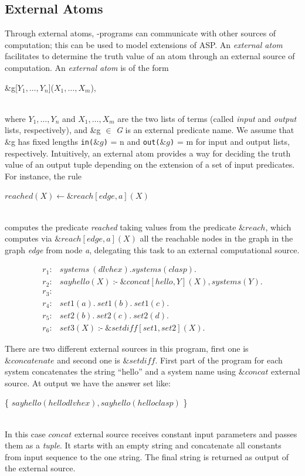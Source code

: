 \documentclass[14pt,a4paper, titlepage]{article}
\newcommand{\ext}[3]{\ensuremath{\&{#1}[#2](#3)}}
\DeclareMathOperator{\leftimpl}{:-}
\begin{document}
\subsection{External Atoms}
\label{extatoms}
Through external atoms, \hex{}-programs can communicate 
with other sources of computation; this can be used to 
model extensions of ASP.  
An \emph{external atom} facilitates to determine the truth 
value of an atom through an external source of computation.
An \emph{external atom} is of the form \\ \centerline{ 
\&g[$Y_1,\dots,Y_n$]($X_1,\dots,X_m$),} \\where $Y_1,
\dots,Y_n$ and $X_1,\dots,X_m$ are the two lists of terms 
(called \textit{input} and \textit{output} lists, 
respectively), and \&g $\in$ \textit{G} is an external 
predicate name. We assume that \&g has fixed lengths 
\texttt{in($\&g$)} = n and \texttt{out($\&g$)} = m for 
input and output lists, respectively. Intuitively, an 
external atom provides a way for deciding the truth value 
of an output tuple depending on the extension of a set of 
input predicates.
For instance, the rule \\ \centerline{ \textit{$reached(X) 
\leftarrow \&reach[edge,a](X)$}}
\\computes the predicate \textit{reached} taking values 
from the predicate $\&reach$, which computes via 
\textit{$\&reach[edge,a](X)$} all the reachable nodes in 
the graph in the graph \textit{edge} from node \textit{a}, 
delegating this task to an external computational source.
\begin{exmp}
\begin{align*}
r_1\colon& \mathit{systems} \ (\mathit{dlvhex}). 
\mathit{systems}(\mathit{clasp}). \\  
r_2\colon& \mathit{sayhello(X)} \leftimpl 
\ext{\mathit{concat}}{\mathit{hello, Y}}{\mathit{X}}, 
\mathit{systems(Y).}  \\ 
r_3\colon & \\
r_4\colon& \mathit{set1}(a). \ \mathit{set1}(b). \ 
\mathit{set1}(c).\\
r_5\colon& \mathit{set2}(b). \ \mathit{set2}(c). \ 
\mathit{set2}(d).\\
r_6\colon& \mathit{set3}(X) \leftimpl 
\ext{\mathit{setdiff}}{\mathit{set1, set2}}{\mathit{X}}. 
\end{align*}
\end{exmp}

There are two different external sources in this program, 
first one is $\mathit{\&concatenate}$ and second one is 
$\mathit{\&setdiff}$. First part of the program for each 
system concatenates the string \enquote{hello} and a system 
name using $\mathit{\&concat}$ external source. At output 
we have the answer set like:\\ 
\centerline{ \{ $\mathit{sayhello}(\mathit{hellodlvhex}), 
\mathit{sayhello}(\mathit{helloclasp})$ \}}
\\In this case $\mathit{concat}$ external source receives 
constant input parameters and passes them as a 
\emph{tuple}. It starts with an empty string and 
concatenate all constants from input sequence to the one 
string. The final string is returned as output of the 
external source.   
\end{document}
